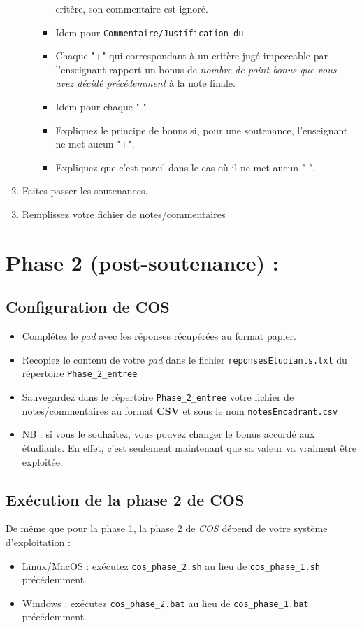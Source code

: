 \documentclass[11pt]{article}
\begin{document}
\begin{enumerate}
\begin{itemize}
\begin{itemize}
critère, son commentaire est ignoré.
\item Idem pour \verb~Commentaire/Justification du -~
\item Chaque "+" qui correspondant à un critère jugé impeccable par
l'enseignant rapport un bonus de \emph{nombre de point bonus que
vous avez décidé précédemment} à la note finale.
\item Idem pour chaque "-"
\item Expliquez le principe de bonus si, pour une soutenance,
l'enseignant ne met aucun "+".
\item Expliquez que c'est pareil dans le cas où il ne met aucun "-".
\end{itemize}
\end{itemize}
\item Faites passer les soutenances.
\item Remplissez votre fichier de notes/commentaires
\end{enumerate}
\section{Phase 2 (post-soutenance) :}
\label{sec-6}
\subsection{Configuration de COS}
\label{sec-6-1}
\begin{itemize}
\item Complétez le \emph{pad} avec les réponses récupérées au format papier.
\item Recopiez le contenu de votre \emph{pad} dans le fichier
\verb~reponsesEtudiants.txt~ du répertoire \verb~Phase_2_entree~
\item Sauvegardez dans le répertoire \verb~Phase_2_entree~ votre fichier de
notes/commentaires au format \textbf{CSV} et sous le nom
\verb~notesEncadrant.csv~
\item NB : si vous le souhaitez, vous pouvez changer le bonus accordé aux
étudiants. En effet, c'est seulement maintenant que sa valeur va
vraiment être exploitée.
\end{itemize}
\subsection{Exécution de la phase 2 de COS}
\label{sec-6-2}
De même que pour la phase 1, la phase 2 de \emph{COS} dépend de votre
système d'exploitation :
\begin{itemize}
\item Linux/MacOS : exécutez \verb~cos_phase_2.sh~ au lieu de \verb~cos_phase_1.sh~
  précédemment.
\item Windows : exécutez \verb~cos_phase_2.bat~ au lieu de \verb~cos_phase_1.bat~
  précédemment.
\end{itemize}
\end{document}
